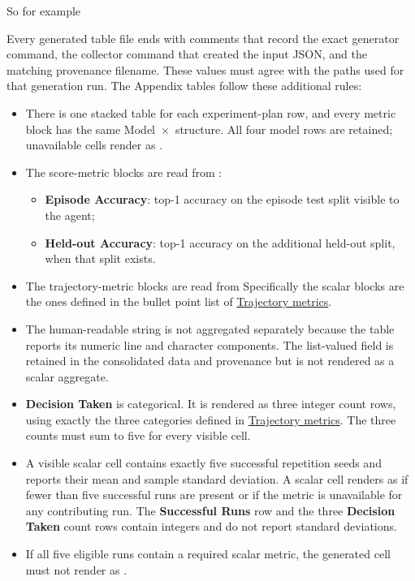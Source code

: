 \documentclass[11pt]{article}
\begin{document}
So for example
\begin{DocCode}
\label{tab:app-per-simulator-gentle-01234-cloud}

\end{DocCode}
Every generated table file ends with comments that record the exact generator command, the collector command that created the input JSON, and the matching provenance filename. These values must agree with the paths used for that generation run.
The Appendix tables follow these additional rules:
\begin{itemize}
  \item There is one stacked table for each experiment-plan row, and every metric block has the same Model~\(\times\)~\termSimulator structure.
  All four model rows are retained; unavailable cells render as \code{-}.

  \item The score-metric blocks are read from :
  \begin{itemize}
    \item \textbf{Episode Accuracy}: top-1 accuracy on the episode test split visible to the agent;
    \item \textbf{Held-out Accuracy}: top-1 accuracy on the additional held-out split, when that split exists.
  \end{itemize}

  \item The trajectory-metric blocks are read from 
  Specifically the scalar blocks are the ones defined in the bullet point list of \hyperref[sec:trajectory-metrics]{Trajectory metrics}.

  \item The human-readable  string is not aggregated separately because the table reports its numeric line and character components.
  The list-valued  field is retained in the consolidated data and provenance but is not rendered as a scalar aggregate.

  \item \textbf{Decision Taken} is categorical.
  It is rendered as three integer count rows, using exactly the three categories defined in \hyperref[sec:trajectory-metrics]{Trajectory metrics}.
  The three counts must sum to five for every visible cell.

  \item A visible scalar cell contains exactly five successful repetition seeds and reports their mean and sample standard deviation.
  A scalar cell renders as \code{-} if fewer than five successful runs are present or if the metric is unavailable for any contributing run.
  The \textbf{Successful Runs} row and the three \textbf{Decision Taken} count rows contain integers and do not report standard deviations.

  \item If all five eligible runs contain a required scalar metric, the generated cell must not render as \code{-}.
\end{itemize}
   
\end{document}

